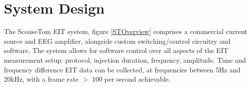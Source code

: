 \section{System Design}

The ScouseTom EIT system, figure \ref{STOverview} comprises a commercial current source and EEG amplifier, alongside custom switching/control circuitry and software. The system allows for software control over all aspects of the EIT measurement setup: protocol, injection duration, frequency, amplitude.  Time and frequency difference EIT data can be collected, at frequencies between 5Hz and 20kHz, with a frame rate $>$ 100 per second achievable.